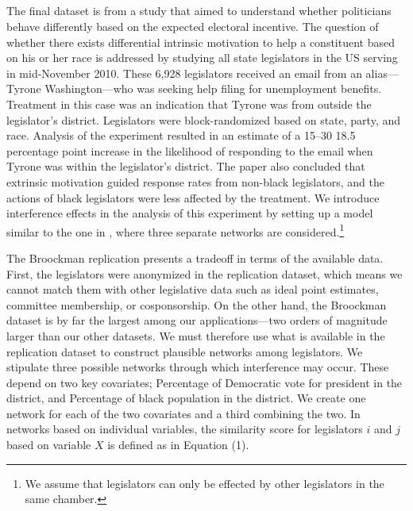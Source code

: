 \documentclass[12pt]{article}
\begin{document}
\subsection{\citet{broockman2013black} }

The final dataset is from a study that aimed to understand whether politicians behave differently based on the expected electoral incentive. The question of whether there exists differential intrinsic motivation to help a constituent based on his or her race is addressed by studying all state legislators in the US serving in mid-November 2010. These 6,928 legislators received an email from an alias---Tyrone Washington---who was seeking help filing for unemployment benefits. Treatment in this case was an indication that Tyrone was from outside the legislator's district. Legislators were block-randomized based on state, party, and race. Analysis of the experiment resulted in an estimate of a 15--30 18.5 percentage point increase in the likelihood of responding to the email when Tyrone was within the legislator's district. The paper also concluded that extrinsic motivation guided response rates from non-black legislators, and the actions of black legislators were less affected by the treatment. We introduce interference effects in the analysis of this experiment by setting up a model similar to the one in \citet{coppock2014information}, where three separate networks are considered.\footnote{We assume that legislators can only be effected by other legislators in the same chamber.}

The Broockman replication presents a tradeoff in terms of the available data. First, the legislators were anonymized in the replication dataset, which means we cannot match them with other legislative data such as ideal point estimates, committee membership, or cosponsorship. On the other hand, the Broockman dataset is by far the largest among our applications---two orders of magnitude larger than our other datasets. We must therefore use what is available in the replication dataset to construct plausible networks among legislators. We stipulate three possible networks through which interference may occur. These depend on two key covariates; Percentage of Democratic vote for president in the district, and Percentage of black population in the district. We create one network for each of the two covariates and a third combining the two. In networks based on individual variables, the similarity score for legislators $i$ and $j$ based on variable $X$ is defined as in Equation (1).
\end{document}
